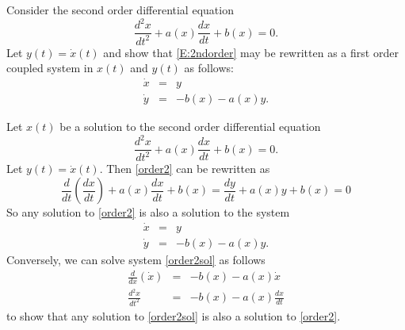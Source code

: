 \documentclass{ximera}
\begin{document}
\begin{exercise} \label{c3.5.5}
Consider the second order differential equation
\begin{equation}  \label{E:2ndorder}
\frac{d^2x}{dt^2} + a(x)\frac{dx}{dt} + b(x) = 0.
\end{equation}
Let $y(t)=\dot{x}(t)$ and show that \eqref{E:2ndorder} may be
rewritten as a first order coupled system in $x(t)$ and $y(t)$
as follows:
\begin{eqnarray*}
\dot{x} & = & y \\
\dot{y} & = & -b(x) - a(x) y.
\end{eqnarray*}

\begin{solution}

Let $x(t)$ be a solution to the second order differential equation
\begin{equation} \label{order2}
\frac{d^2x}{dt^2} + a(x)\frac{dx}{dt} + b(x) = 0.
\end{equation}
Let $y(t) = \dot x(t)$.  Then \eqref{order2} can be rewritten as
\[ \frac{d}{dt}\left(\frac{dx}{dt}\right) + a(x)\frac{dx}{dt}
+ b(x) = \frac{dy}{dt} + a(x)y + b(x) = 0 \]
So any solution to \eqref{order2} is also a solution to the system
\begin{equation} \label{order2sol}
\begin{array}{rcl}
\dot{x} & = & y \\
\dot{y} & = & -b(x) - a(x) y.\end{array}
\end{equation}
Conversely, we can solve system \eqref{order2sol} as follows
\[ \begin{array}{rcl}
\frac{d}{dx}\left(\dot{x}\right) & = & -b(x) - a(x)\dot{x} \\
\frac{d^2x}{dt^2} & = & -b(x) - a(x)\frac{dx}{dt}\end{array}
\]
to show that any solution to \eqref{order2sol} is also a solution
to \eqref{order2}.

\end{solution}
\end{exercise}
\end{document}
